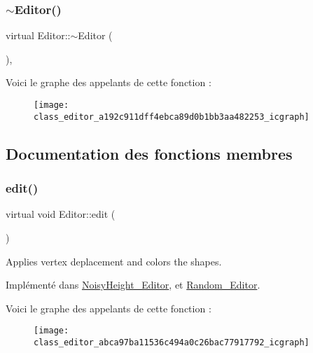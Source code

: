 \subsubsection{\texorpdfstring{$\sim$\+Editor()}{~Editor()}}
{\footnotesize\ttfamily virtual Editor\+::$\sim$\+Editor (\begin{DoxyParamCaption}{ }\end{DoxyParamCaption})\hspace{0.3cm}{\ttfamily [virtual]}, {\ttfamily [default]}}

Voici le graphe des appelants de cette fonction \+:\nopagebreak
\begin{figure}[H]
\begin{center}
\leavevmode
\texttt{[image: class\_editor\_a192c911dff4ebca89d0b1bb3aa482253\_icgraph]}
\end{center}
\end{figure}


\subsection{Documentation des fonctions membres}
\mbox{\label{class_editor_abca97ba11536c494a0c26bac77917792}} 
\subsubsection{\texorpdfstring{edit()}{edit()}}
{\footnotesize\ttfamily virtual void Editor\+::edit (\begin{DoxyParamCaption}{ }\end{DoxyParamCaption})\hspace{0.3cm}{\ttfamily [pure virtual]}}



Applies vertex deplacement and colors the shapes. 



Implémenté dans \hyperlink{class_noisy_height___editor_a3ed5c7267dec56ff2f21366ce2ae9818}{Noisy\+Height\+\_\+\+Editor}, et \hyperlink{class_random___editor_abea41199b1502f89be0b2914b3c191fc}{Random\+\_\+\+Editor}.

Voici le graphe des appelants de cette fonction \+:
\nopagebreak
\begin{figure}[H]
\begin{center}
\leavevmode
\texttt{[image: class\_editor\_abca97ba11536c494a0c26bac77917792\_icgraph]}
\end{center}
\end{figure}
\mbox{\label{class_editor_a5747cd74b71d67f6d39b094071058382}} 
